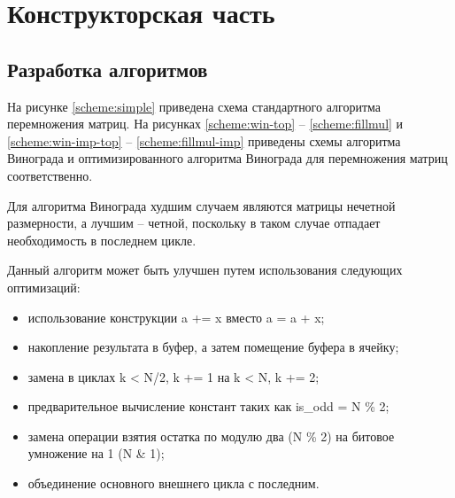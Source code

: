 \chapter{Конструкторская часть}

\section{Разработка алгоритмов}
На рисунке \ref{scheme:simple} приведена схема стандартного алгоритма перемножения матриц.
На рисунках \ref{scheme:win-top} -- \ref{scheme:fillmul} и \ref{scheme:win-imp-top} -- \ref{scheme:fillmul-imp} приведены
схемы алгоритма Винограда и оптимизированного алгоритма Винограда для перемножения матриц соответственно.

Для алгоритма Винограда худшим случаем являются матрицы нечетной размерности, а лучшим -- четной, поскольку
в таком случае отпадает необходимость в последнем цикле.

Данный алгоритм может быть улучшен путем использования следующих оптимизаций:
\begin{itemize}
	\item использование конструкции a += x вместо a = a + x;
	\item накопление результата в буфер, а затем помещение буфера в ячейку;
	\item замена в циклах k < N/2, k += 1 на k < N, k += 2;
	\item предварительное вычисление констант таких как is\_odd = N \% 2;
	\item замена операции взятия остатка по модулю два (N \% 2) на битовое умножение на 1 (N \& 1);
	\item объединение основного внешнего цикла с последним.
\end{itemize}


